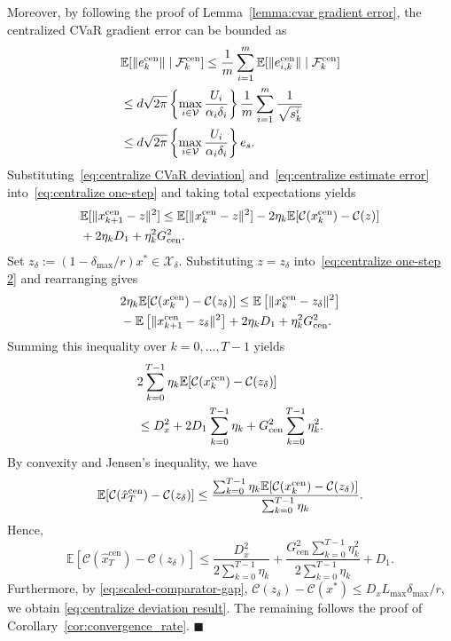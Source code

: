 \documentclass[twocolumn]{autart}    %
\newcommand{\brk}[1]{\left[#1\right]}
\newcommand{\1}{\mathbf{1}}
\begin{document}
Moreover, by following the proof of Lemma~\ref{lemma:cvar gradient error}, the centralized CVaR gradient error can be bounded as
\begin{align}\label{eq:centralize estimate error}
&   \mathbb{E}[\|e_k^{\rm cen}\| \mid \mathcal{F}_{k}^{\rm cen}] \le \frac{1}{m} \sum_{i=1}^{m} \mathbb{E}[\|e_{i,k}^{\rm cen}\| \mid \mathcal{F}_{k}^{\rm cen}] \nonumber \\ 
&\le   d\sqrt{2\pi } \left\{ \max_{i \in \mathcal{V}} 
\frac{U_{i}}{\alpha_{i} \delta_{i}} \right\} \frac{1}{m} \sum_{i=1}^{m} \frac{1}{\sqrt{s_{k}^{i}}} 
 \nonumber \\ 
&\le d\sqrt{2\pi } \left\{ \max_{i \in \mathcal{V}} \frac{U_{i}}{\alpha_{i} \delta_{i}} \right\} e_s .
\end{align} 
Substituting~\eqref{eq:centralize CVaR deviation} and~\eqref{eq:centralize estimate error} into~\eqref{eq:centralize one-step} and taking total expectations yields
\begin{align}\label{eq:centralize one-step 2}
&   \mathbb{E}[\|x_{k+1}^{\rm cen} - z\|^{2}] \le \mathbb{E}[\|x_k^{\rm cen} - z\|^{2}] - 2\eta_{k} \mathbb{E}[\mathcal{C}(x_k^{\rm cen}) - \mathcal{C}(z)] \nonumber \\ 
&+  2\eta_{k}D_1 + \eta_{k}^{2} G_{\text{cen}}^{2}.
\end{align}
Set $z_\delta:=(1-\delta_{\max}/r)x^\ast\in\mathcal X_\delta$. Substituting $z=z_\delta$ into~\eqref{eq:centralize one-step 2} and rearranging gives
\begin{align*}
&2\eta_{k} \mathbb{E}[\mathcal{C}(x_k^{\rm cen}) - \mathcal{C}(z_\delta)] \le \mathbb{E}\brk{\|x_k^{\rm cen} - z_\delta\|^{2}} \nonumber\\
&- \mathbb{E}\brk{\|x_{k+1}^{\rm cen} - z_\delta\|^{2}}+ 2\eta_{k}D_1   + \eta_{k}^{2} G_{\text{cen}}^{2}    .
\end{align*}
Summing this inequality over $k=0,\ldots,T-1$ yields 
\begin{align*}
& 2 \sum_{k=0}^{T-1} \eta_{k} \mathbb{E}[\mathcal{C}(x_k^{\rm cen}) - \mathcal{C}(z_\delta)] \nonumber \\
 &\le D_{x}^{2} + 2D_1  \sum_{k=0}^{T-1} \eta_{k} + G_{\text{cen}}^{2} \sum_{k=0}^{T-1} \eta_{k}^{2}.   
\end{align*}
By convexity and Jensen's inequality, we have 
$$\mathbb{E}[\mathcal{C}(\hat{x}_{T}^{\text{cen}}) - \mathcal{C}(z_\delta)] \le \frac{\sum_{k=0}^{T-1} \eta_{k} \mathbb{E}[\mathcal{C}(x_k^{\rm cen}) - \mathcal{C}(z_\delta)]}{\sum_{k=0}^{T-1} \eta_{k}}.$$
Hence,
$$\mathbb{E}[\mathcal{C}(\hat{x}_{T}^{\text{cen}}) - \mathcal{C}(z_\delta)] \le \frac{D_{x}^{2}}{2 \sum_{k=0}^{T-1} \eta_{k}} + \frac{G_{\text{cen}}^{2} \sum_{k=0}^{T-1} \eta_{k}^{2}}{2 \sum_{k=0}^{T-1} \eta_{k}} + D_1.  $$ 
Furthermore, by \eqref{eq:scaled-comparator-gap}, $\mathcal C(z_\delta)-\mathcal C(x^\ast)\le D_xL_{\max}\delta_{\max}/r$, we obtain \eqref{eq:centralize deviation result}. The remaining follows the proof of Corollary~\ref{cor:convergence_rate}.
\hfill $\blacksquare$
\end{document}
